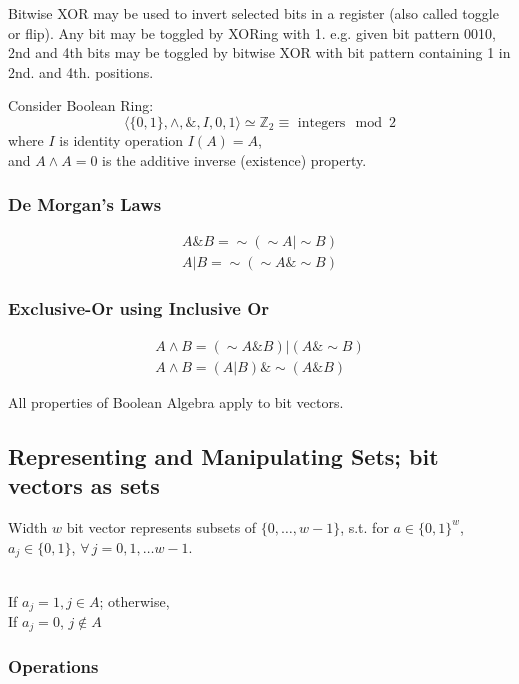 \documentclass[10pt]{amsart}
\begin{document}
\begin{multicols*}{2}
Bitwise XOR may be used to invert selected bits in a register (also called toggle or flip). Any bit may be toggled by XORing with 1. e.g. given bit pattern 0010, 2nd and 4th bits may be toggled by bitwise XOR with bit pattern containing 1 in 2nd. and 4th. positions.



Consider Boolean Ring:
\[
\langle \lbrace 0 , 1 \rbrace, \wedge, \&, I, 0 , 1 \rangle \simeq \mathbb{Z}_2 \equiv  \text{ integers} \mod{2} 
\]
where $I$ is identity operation $I(A) = A$, \\
and 
$A\wedge A = 0$ is the additive inverse (existence) property.

\subsubsection{De Morgan's Laws}

\[
\begin{gathered}
A \& B = \sim (\sim A | \sim B) \\
A | B = \sim (\sim A \& \sim B)
\end{gathered}
\]

\subsubsection{Exclusive-Or using Inclusive Or}

\[
\begin{gathered} 
	A \wedge B = (\sim A \& B) | (A \& \sim B) \\
 A \wedge B = (A | B) \& \sim (A \& B)
\end{gathered} 
\]

All properties of Boolean Algebra apply to bit vectors.

\subsection{Representing and Manipulating Sets; bit vectors as sets}

Width $w$ bit vector represents subsets of $\lbrace 0 ,\dots, w-1 \rbrace$, s.t. for $a\in \lbrace 0 ,1 \rbrace^w$, $a_j \in \lbrace 0 , 1 \rbrace$, $\forall \, j = 0,1,\dots w -1$. 

\qquad \\
If $a_j = 1, j \in A$; otherwise, \\
If $a_j =0$, $j \notin A$
\qquad \\

\subsubsection{Operations}


\end{multicols*}
\end{document}
